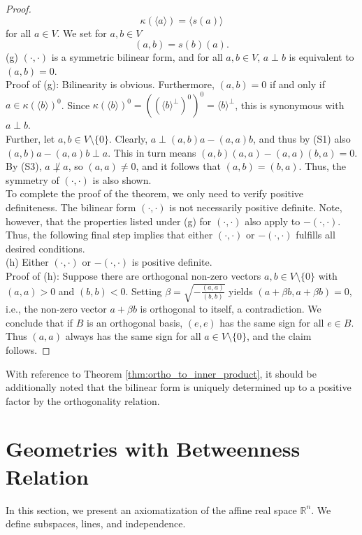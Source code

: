 \documentclass[11pt,a4paper]{article}
\begin{document}
\begin{proof}
\[ \kappa(\langle a \rangle) = \langle s(a) \rangle \]
for all $a \in V$. We set for $a, b \in V$
\[ (a, b) = s(b)(a). \]
(g) $(\cdot, \cdot)$ is a symmetric bilinear form, and for all $a, b \in V$, $a \perp b$ is equivalent to $(a, b) = 0$. \\
Proof of (g): Bilinearity is obvious. Furthermore, $(a, b) = 0$ if and only if $a \in \kappa(\langle b \rangle)^0$. Since $\kappa(\langle b \rangle)^0 = ((\langle b \rangle^\perp)^0)^0 = \langle b \rangle^\perp$, this is synonymous with $a \perp b$. \\
Further, let $a, b \in V \setminus \{0\}$. Clearly, $a \perp (a, b)a - (a, a)b$, and thus by (S1) also $(a, b)a - (a, a)b \perp a$. This in turn means $(a, b)(a, a) - (a, a)(b, a) = 0$. By (S3), $a \not\perp a$, so $(a, a) \neq 0$, and it follows that $(a, b) = (b, a)$. Thus, the symmetry of $(\cdot, \cdot)$ is also shown. \\
To complete the proof of the theorem, we only need to verify positive definiteness. The bilinear form $(\cdot, \cdot)$ is not necessarily positive definite. Note, however, that the properties listed under (g) for $(\cdot, \cdot)$ also apply to $-(\cdot, \cdot)$. Thus, the following final step implies that either $(\cdot, \cdot)$ or $-(\cdot, \cdot)$ fulfills all desired conditions. \\
(h) Either $(\cdot, \cdot)$ or $-(\cdot, \cdot)$ is positive definite. \\
Proof of (h): Suppose there are orthogonal non-zero vectors $a, b \in V \setminus \{0\}$ with $(a, a) > 0$ and $(b, b) < 0$. Setting $\beta = \sqrt{-\frac{(a,a)}{(b,b)}}$ yields $(a + \beta b, a + \beta b) = 0$, i.e., the non-zero vector $a + \beta b$ is orthogonal to itself, a contradiction. We conclude that if $B$ is an orthogonal basis, $(e, e)$ has the same sign for all $e \in B$. Thus $(a, a)$ always has the same sign for all $a \in V \setminus \{0\}$, and the claim follows.
\end{proof}

With reference to Theorem \ref{thm:ortho_to_inner_product}, it should be additionally noted that the bilinear form is uniquely determined up to a positive factor by the orthogonality relation.

\section{Geometries with Betweenness Relation}

In this section, we present an axiomatization of the affine real space $\mathbb{R}^n$. We define subspaces, lines, and independence.
\end{document}
